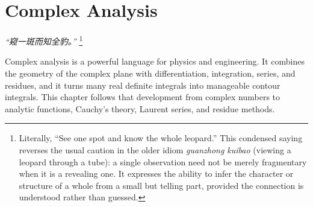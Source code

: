 \chapter{Complex Analysis}
\renewcommand{\currentchapterpath}{chapters/ch03/}

\begin{flushright}
\textit{“窥一斑而知全豹。” }
\footnote{Literally, ``See one spot and know the whole leopard.'' 
This condensed saying reverses the usual caution in the older idiom 
\textit{guanzhong kuibao} (viewing a leopard through a tube): 
a single observation need not be merely fragmentary when it is a 
revealing one. It expresses the ability to infer the character or 
structure of a whole from a small but telling part, provided the 
connection is understood rather than guessed.}
\end{flushright}


Complex analysis is a powerful language for physics and engineering. It combines the geometry of the complex plane with differentiation, integration, series, and residues, and it turns many real definite integrals into manageable contour integrals. This chapter follows that development from complex numbers to analytic functions, Cauchy's theory, Laurent series, and residue methods.

